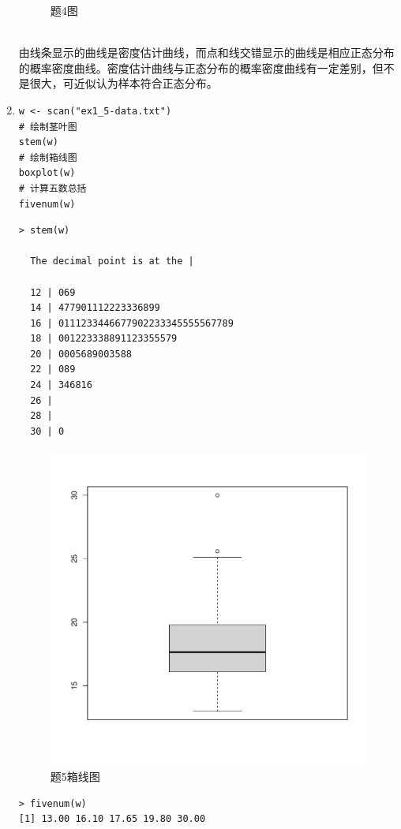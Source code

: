 \begin{enumerate}
\begin{figure}[H]
            \caption{题4图}
        \end{figure}
        \summary\\
        由线条显示的曲线是密度估计曲线，而点和线交错显示的曲线是相应正态分布的概率密度曲线。密度估计曲线与正态分布的概率密度曲线有一定差别，但不是很大，可近似认为样本符合正态分布。
        \item
        \code
\begin{lstlisting}
w <- scan("ex1_5-data.txt")
# 绘制茎叶图
stem(w)
# 绘制箱线图
boxplot(w)
# 计算五数总括
fivenum(w)
\end{lstlisting}
        \out
\begin{lstlisting}
> stem(w)

  The decimal point is at the |

  12 | 069
  14 | 477901112223336899
  16 | 0111233446677902233345555567789
  18 | 001223338891123355579
  20 | 0005689003588
  22 | 089
  24 | 346816
  26 | 
  28 | 
  30 | 0
\end{lstlisting}
        \begin{figure}[H]
            \centering
            \includegraphics[scale=0.5]{1-5箱线图.pdf}
            \caption{题5箱线图}
        \end{figure}
\begin{lstlisting}
> fivenum(w)
[1] 13.00 16.10 17.65 19.80 30.00

\end{lstlisting}
\end{enumerate}
